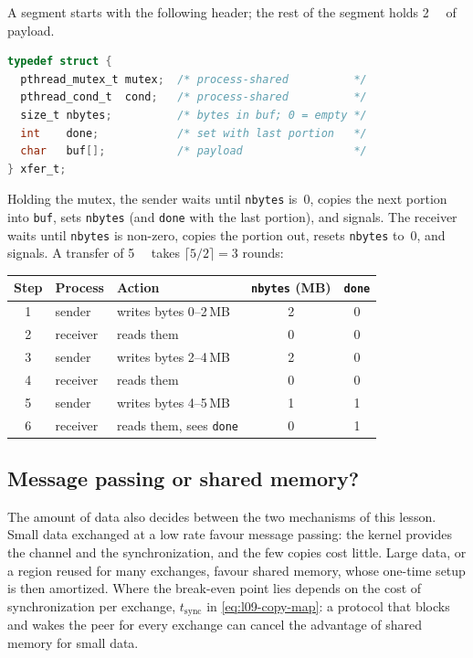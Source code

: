 \documentclass[../main.tex]{subfiles}
\begin{document}
\begin{example}
  \label{ex:l09-rounds}
  A segment starts with the following header; the rest of the segment holds
  \SI{2}{\mega\byte} of payload.
  \begin{lstlisting}[language=C, numbers=none]
typedef struct {
  pthread_mutex_t mutex;  /* process-shared          */
  pthread_cond_t  cond;   /* process-shared          */
  size_t nbytes;          /* bytes in buf; 0 = empty */
  int    done;            /* set with last portion   */
  char   buf[];           /* payload                 */
} xfer_t;
\end{lstlisting}
  Holding the mutex, the sender waits until \texttt{nbytes} is~0, copies
  the next portion into \texttt{buf}, sets \texttt{nbytes} (and
  \texttt{done} with the last portion), and signals.  The receiver waits
  until \texttt{nbytes} is non-zero, copies the portion out, resets
  \texttt{nbytes} to~0, and signals.  A transfer of \SI{5}{\mega\byte} takes
  $\lceil 5/2 \rceil = 3$ rounds:
  \begin{center}
    \small
    \begin{tabular}{@{}cllcc@{}}
      \toprule
      Step & Process & Action & \texttt{nbytes} (MB) & \texttt{done} \\
      \midrule
      1 & sender   & writes bytes 0--2\,MB & 2 & 0 \\
      2 & receiver & reads them            & 0 & 0 \\
      3 & sender   & writes bytes 2--4\,MB & 2 & 0 \\
      4 & receiver & reads them            & 0 & 0 \\
      5 & sender   & writes bytes 4--5\,MB & 1 & 1 \\
      6 & receiver & reads them, sees \texttt{done} & 0 & 1 \\
      \bottomrule
    \end{tabular}
  \end{center}
\end{example}

\subsection{Message passing or shared memory?}

The amount of data also decides between the two mechanisms of this lesson.
Small data exchanged at a low rate favour message passing: the kernel
provides the channel and the synchronization, and the few copies cost
little.  Large data, or a region reused for many exchanges, favour shared
memory, whose one-time setup is then amortized.  Where the break-even point
lies depends on the cost of synchronization per exchange,
$t_{\mathrm{sync}}$ in \cref{eq:l09-copy-map}: a protocol that blocks and
wakes the peer for every exchange can cancel the advantage of shared memory
for small data.
\end{document}
